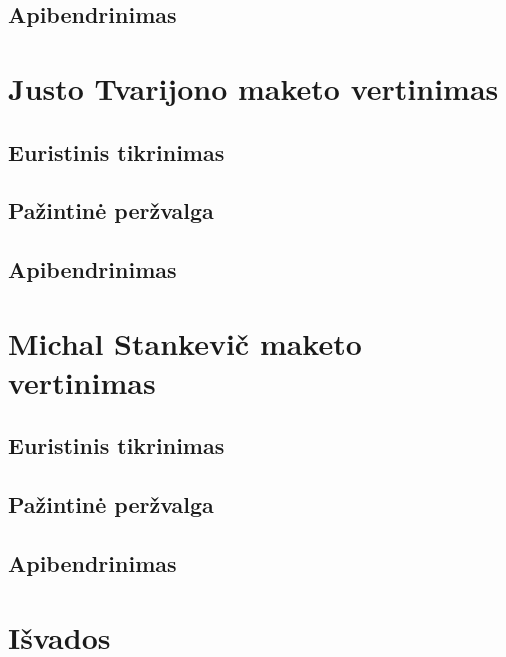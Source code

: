 \documentclass[oneside]{VUMIFPSkursinis}
\begin{document}
\subsection{Apibendrinimas}
\section{Justo Tvarijono maketo vertinimas}
\subsection{Euristinis tikrinimas}
\subsection{Pažintinė peržvalga}
\subsection{Apibendrinimas}
\section{Michal Stankevič maketo vertinimas}
\subsection{Euristinis tikrinimas}
\subsection{Pažintinė peržvalga}
\subsection{Apibendrinimas}
\section{Išvados}
\end{document}
